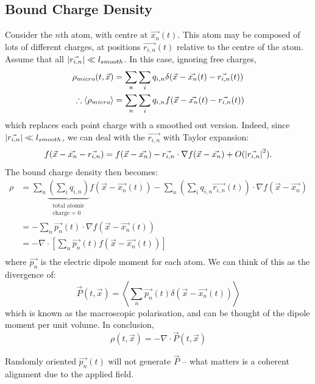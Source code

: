 \documentclass[../Main.tex]{subfiles}
\begin{document}
\subsection{Bound Charge Density}
Consider the $n$th atom, with centre at $\vec{x_n}(t)$. This atom may be composed of lots of different charges, at positions $\vec{r_{i, n}}(t)$ relative to the centre of the atom. Assume that all $\left|\vec{r_{i, n}}\right| \ll l_{smooth}$. In this case, ignoring free charges,
\begin{align*}
    \rho_{micro} (t, \vec x) &= \sum_n \sum_i q_{i, n} \delta(\vec{x} - \vec{x_n}(t) - \vec{r_{i, n}}(t)) \\
    \therefore \langle\rho_{micro}\rangle &= \sum_n \sum_i q_{i, n} f(\vec{x} - \vec{x_n}(t) - \vec{r_{i, n}}(t)) \\
\end{align*}
which replaces each point charge with a smoothed out version. Indeed, since $\left|\vec{r_{i, n}}\right| \ll l_{smooth}$, we can deal with the $\vec{r_{i, n}}$ with Taylor expansion:
\begin{equation*}
    f(\vec x - \vec{x_n} - \vec{r_{i, n}}) = f(\vec{x} - \vec{x_n}) - \vec{r_{i, n}} \cdot \nabla f(\vec{x} - \vec{x_n}) + O(\left|\vec{r_{i, n}}\right|^2).
\end{equation*}
The bound charge density then becomes:
\begin{align*}
    \rho &= \sum_n \underbrace{\left(\sum_i q_{i, n}\right)}_{\substack{\text{total atomic}\\\text{charge} = 0}}f(\vec x - \vec{x_n}(t)) - \sum_n \left(\sum_i q_{i, n} \vec{r_{i, n}}(t)\right)\cdot\nabla f(\vec{x} - \vec{x_n}) \\
    &= -\sum_n \vec{p_n}(t) \cdot \nabla f(\vec x - \vec{x_n}(t)) \\
    &= -\nabla \cdot \left[\sum_n \vec{p_n}(t) f(\vec x - \vec{x_n}(t))\right] \\
\end{align*}
where $\vec{p_n}$ is the electric dipole moment for each atom. We can think of this as the divergence of:
\begin{equation*}
    \vec{P}(t, \vec{x}) = \left\langle\sum_n \vec{p_n}(t) \delta(\vec{x} - \vec{x_n}(t))\right\rangle
\end{equation*}
which is known as the macroscopic polarisation, and can be thought of the dipole moment per unit volume. In conclusion,
\begin{equation}
    \rho(t, \vec{x}) = - \nabla \cdot \vec{P}(t, \vec{x})
    \label{eqnBoundChargeDens}
\end{equation}
\begin{remark}
    Randomly oriented $\vec{p_n}(t)$ will not generate $\vec P$ -- what matters is a coherent alignment due to the applied field.
\end{remark}
\end{document}
